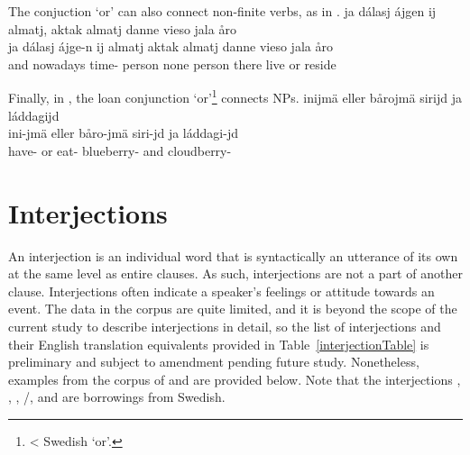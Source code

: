 The conjuction  ‘or’ can also connect non-finite verbs, as in . 
\ea\label{conjunctionEx5}%
\glll	ja dálasj ájgen ij almatj, aktak almatj danne vieso jala åro\\
	ja dálasj ájge-n ij almatj aktak almatj danne vieso jala åro\\
	and nowadays time- \BS{} person\BS{} none person\BS{} there live\BS{} or reside\BS{}\\\nopagebreak
{}	
\z

Finally, in , the loan conjunction  ‘or’\footnote{< Swedish  ‘or’.} connects NPs. 
\ea\label{conjunctionEx6}%
\glll	inijmä eller bårojmä sirijd ja láddagijd\\
	ini-jmä eller båro-jmä siri-jd ja láddagi-jd\\
	have- or eat- blueberry- and cloudberry-\\\nopagebreak
{}	
\z
{}

\section{Interjections}\label{interjections}
An {interjection} is an individual word that is syntactically an utterance of its own at the same level as entire clauses. As such, interjections are not a part of another clause. Interjections often indicate a speaker’s feelings or attitude towards an event. The data in the corpus are quite limited, and it is beyond the scope of the current study to describe interjections in detail, so the 
list of interjections %
and their English translation equivalents provided in Table~\vref{interjectionTable} is preliminary and subject to amendment pending future study. %
Nonetheless, examples from the corpus of  and  are provided below. 
Note that the interjections , , , /,  and  are borrowings from Swedish. %

